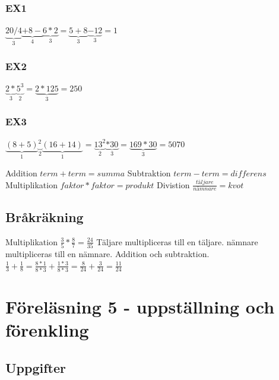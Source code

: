 \documentclass[a4paper,10pt]{article}
\begin{document}
\begin{flushleft}
      \subsubsection{EX1}
        $ \underbrace{20/4}_{\text{3}}\underbrace{+8-}_{\text{4}}\underbrace{6*2}_{\text{3}}=\underbrace{5+8}_{\text{3}}\underbrace{-12}_{\text{3}}=1 $\newline
      \subsubsection{EX2}
        $ \underbrace{2*}_{\text{3}}\underbrace{5^3}_{\text{2}}=\underbrace{2*125}_{\text{3}}=250 $
      \subsubsection{EX3}
        $\underbrace{(8+5)}_{\text{1}}\underbrace{^2}_{\text{2}}\underbrace{(16+14)}_{\text{1}}=\underbrace{13^2}_{\text{2}}\underbrace{*30}_{\text{3}}=\underbrace{169*30}_{\text{3}}=5070 $

    Addition $ term+term=summa $\newline
    Subtraktion $ term-term=differens $\newline
    Multiplikation $ faktor*faktor=produkt $\newline
    Divistion $ \frac{täljare}{nämnare}=kvot $\newline
    \subsection{Bråkräkning}
    Multiplikation $ \frac{3}{5}*\frac{8}{7}=\frac{24}{35} $\newline
    Täljare multipliceras till en täljare.\newline
    nämnare multipliceras till en nämnare.\newline
    Addition och subtraktion.\newline
    $ \frac{1}{3}+\frac{1}{8}=\frac{8*1}{8*3}+\frac{1*3}{8*3}=\frac{8}{24}+\frac{3}{24}=\frac{11}{24} $

\section{Föreläsning 5 - uppställning och förenkling}
  \subsection{Uppgifter}

\end{flushleft}
\end{document}

